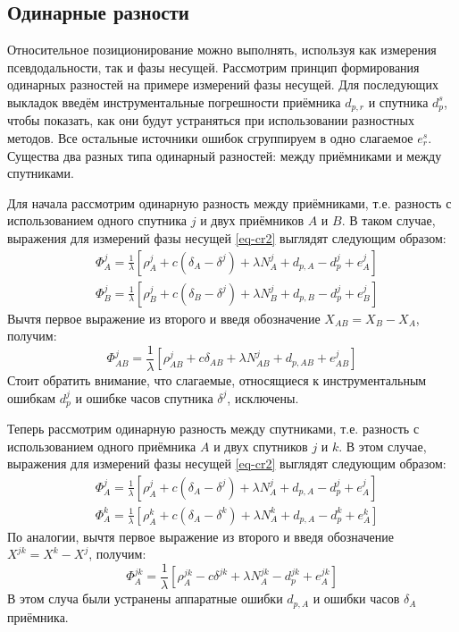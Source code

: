 \subsection*{\textbf{Одинарные разности}}

Относительное позиционирование можно выполнять, используя как измерения псевдодальности, так и фазы несущей.
Рассмотрим принцип формирования одинарных разностей на примере измерений фазы несущей.
Для последующих выкладок введём инструментальные погрешности приёмника $d_{p,r}$ и спутника $d_p^s$, чтобы показать, как они будут устраняться при использовании разностных методов.
Все остальные источники ошибок сгруппируем в одно слагаемое $e_r^s$.
Существа два разных типа одинарный разностей: между приёмниками и между спутниками.

Для начала рассмотрим одинарную разность между приёмниками, т.е. разность с использованием одного спутника $j$ и двух приёмников $A$ и $B$.
В таком случае, выражения для измерений фазы несущей \eqref{eq-cr2} выглядят следующим образом: 
\begin{equation}
\begin{aligned}
&\Phi_A^j=\frac{1}{\lambda}\left[\rho_A^j+c(\delta_A-\delta^j)+\lambda N_A^j+d_{p,A}-d_p^j+e_A^j\right] \\
&\Phi_B^j=\frac{1}{\lambda}\left[\rho_B^j+c(\delta_B-\delta^j)+\lambda N_B^j+d_{p,B}-d_p^j+e_B^j\right] 
\end{aligned}    
\end{equation}
Вычтя первое выражение из второго и введя обозначение $X_{AB}=X_B-X_A$, получим:
\begin{equation}
\label{eq-single-diff}
\Phi_{AB}^j=\frac{1}{\lambda}\left[\rho_{AB}^j+c\delta_{AB}+\lambda N_{AB}^j+d_{p,AB}+e_{AB}^j\right]    
\end{equation}
Стоит обратить внимание, что слагаемые, относящиеся к инструментальным ошибкам $d_p^j$ и ошибке часов спутника $\delta^j$, исключены.

Теперь рассмотрим одинарную разность между спутниками, т.е. разность с использованием одного приёмника $A$ и двух спутников $j$ и $k$.
В этом случае, выражения для измерений фазы несущей \eqref{eq-cr2} выглядят следующим образом: 
\begin{equation}
\begin{aligned}
&\Phi_A^j=\frac{1}{\lambda}\left[\rho_A^j+c(\delta_A-\delta^j)+\lambda N_A^j+d_{p,A}-d_p^j+e_A^j\right] \\
&\Phi_A^k=\frac{1}{\lambda}\left[\rho_A^k+c(\delta_A-\delta^k)+\lambda N_A^k+d_{p,A}-d_p^k+e_A^k\right] 
\end{aligned}    
\end{equation}
По аналогии, вычтя первое выражение из второго и введя обозначение $X^{jk}=X^k-X^j$, получим: 
\begin{equation}
\label{eq-single-diff2}
\Phi_A^{jk}=\frac{1}{\lambda}\left[\rho_A^{jk}-c\delta^{jk}+\lambda N_A^{jk}-d_p^{jk}+e_A^{jk}\right]    
\end{equation}
В этом случа были устранены аппаратные ошибки $d_{p,A}$ и ошибки часов $\delta_A$ приёмника.

